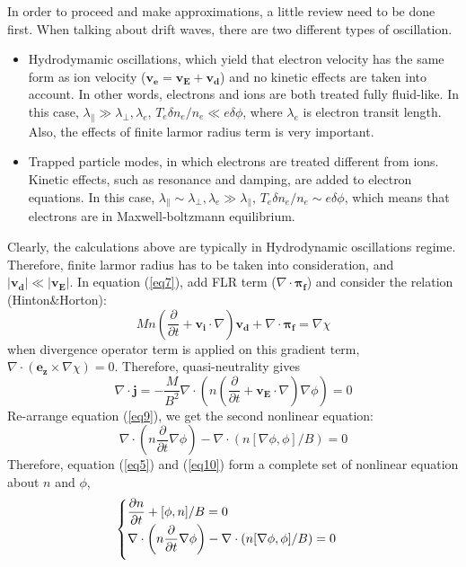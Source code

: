 \documentclass{article}
\begin{document}
In order to proceed and make approximations, a little review need to be done first. When talking about drift waves, there are two different types of oscillation. 
\begin{itemize}
\item Hydrodymamic oscillations, which yield that electron velocity has the same form as ion velocity ($\bm{v_e}=\bm{v_E}+\bm{v_d}$) and no kinetic effects are taken into account. In other words, electrons and ions are both treated fully fluid-like. In this case, $\lambda_{\|}\gg \lambda_{\perp}, \lambda_e $, $T_e\delta n_e/n_e\ll e\delta\phi $, where $\lambda_e$ is electron transit length. Also, the effects of finite larmor radius term is very important.

\item Trapped particle modes, in which electrons are treated different from ions. Kinetic effects, such as resonance and damping, are added to electron equations. In this case, $\lambda_{\|}\sim \lambda_{\perp}, \lambda_e\gg \lambda_{\|}$, $T_e\delta n_e/n_e\sim e\delta\phi$, which means that electrons are in Maxwell-boltzmann equilibrium. 
\end{itemize}
Clearly, the calculations above are typically in Hydrodynamic oscillations regime. Therefore, finite larmor radius has to be taken into consideration, and $|\bm{v_d}|\ll |\bm{v_E}|$. In equation (\ref{eq7}), add FLR term ($\nabla\cdot\bm{\pi_f}$) and consider the relation (Hinton\&Horton):
\begin{equation}
M n\left(\frac{\partial}{\partial t}+\bm{v_i}\cdot\nabla\right)\bm{v_d}+\nabla\cdot\bm{\pi_f}=\nabla\chi
\label{eq8}
\end{equation}
when divergence operator term is applied on this gradient term, $\nabla\cdot(\bm{e_z}\times\nabla\chi)=0$. Therefore, quasi-neutrality gives
\begin{equation}
\nabla\cdot\bm{j}=-\frac{M}{B^2}\nabla\cdot\left(n\left(\frac{\partial}{\partial t}+\bm{v_E}\cdot\nabla\right)\nabla\phi\right)=0
\label{eq9}
\end{equation} 
Re-arrange equation (\ref{eq9}), we get the second nonlinear equation:
\begin{equation}
\nabla\cdot\left(n\frac{\partial}{\partial t}\nabla\phi\right)-\nabla\cdot\left(n[\nabla\phi,\phi]/B\right)=0
\label{eq10}
\end{equation}
Therefore, equation (\ref{eq5}) and (\ref{eq10}) form a complete set of nonlinear equation about $n$ and $\phi$,
\begin{equation*}
\begin{cases}
\displaystyle \frac{\partial n}{\partial t}+[\phi, n]/B=0\\
\vspace{5pt}
\displaystyle \nabla\cdot\left(n\frac{\partial}{\partial t}\nabla\phi\right)-\nabla\cdot\left(n[\nabla\phi,\phi]/B\right)=0
\end{cases}
\end{equation*}
\end{document}
